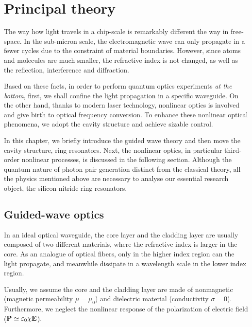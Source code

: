 \chapter{Principal theory}

The way how light travels in a chip-scale is remarkably different the way in free-space. In the sub-micron scale, the electromagnetic wave can only propagate in a fewer cycles due to the constraint of material boundaries. However, since atoms and molecules are much smaller, the refractive index is not changed, as well as the reflection, interference and diffraction. 

Based on these facts, in order to perform quantum optics experiments \textit{at the bottom}, first, we shall confine the light propagation in a specific waveguide. On the other hand, thanks to modern laser technology, nonlinear optics is involved and give birth to optical frequency conversion. To enhance these nonlinear optical phenomena, we adopt the cavity structure and achieve sizable control.

In this chapter, we briefly introduce the guided wave theory and then move the cavity structure, ring resonators. Next, the nonlinear optics, in particular third-order nonlinear processes, is discussed in the following section. Although the quantum nature of photon pair generation distinct from the classical theory, all the physics mentioned above are necessary to analyse our essential research object, the silicon nitride ring resonators.


\section{Guided-wave optics}\label{sec:guide}

In an ideal optical waveguide, the core layer and the cladding layer are usually composed of two different materials, where the refractive index is larger in the core. As an analogue of optical fibers, only in the higher index region can the light propagate, and meanwhile dissipate in a wavelength scale in the lower index region.

Usually, we assume the core and the cladding layer are made of nonmagnetic (magnetic permeability $\mu = \mu_0$) and dielectric material (conductivity $\sigma = 0$). Furthermore, we neglect the nonlinear response of the polarization of electric field ($\vb{P} \simeq \varepsilon_0 \chi \vb{E}$).

